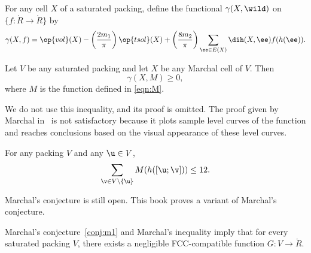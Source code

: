 \begin{definition}[$\gamma$] 
   For any cell $X$ of a saturated
  packing, define the functional $\gamma(X,\wild)$ on
  $\{f:\ring{R}\to\ring{R}\}$ by
\begin{equation}\label{eqn:gamma-def} 
\gamma(X,f) =  \op{vol}(X)
-\left(\frac{2m_1}{\pi}\right) \op{tsol}(X) + \left(\frac{8m_2}{\pi}\right)
\sum_{\ee\in E(X)} \dih(X,\ee)  f(h(\ee)).
\end{equation}
%
\end{definition}


\begin{theorem}\label{lemma:MI} 
  Let $V$ be any saturated packing and let $X$ be any Marchal cell of
  $V$.  Then
\begin{equation}\label{eqn:mfe} 
\gamma(X,M)\ge 0,
\end{equation}
where $M$ is the function defined in \eqref{eqn:M}.
\end{theorem}

\begin{remark}  %
  We do not use this inequality, and its proof is omitted.  The proof
  given by Marchal in~\cite{marchal:2009} is not satisfactory because
  it plots sample level curves of the function and reaches conclusions
  based on the visual appearance of these level curves.
\end{remark}


\begin{conjecture}[Marchal]\label{conj:m1} 
For any packing $ V$ and
any $ \u\in V$,
\[  
\sum_{\v\in V\setminus\{\u\}} M(h([\u;\v])) \le 12.
\] 
\end{conjecture}

Marchal's conjecture is still open.  This book proves a variant of
Marchal's conjecture.

\begin{theorem}\label{theorem:mk1} 
  Marchal's conjecture~\eqref{conj:m1} and Marchal's inequality imply
  that for every saturated packing $V$, there exists a negligible
  FCC-compatible function $G:V\to \ring{R}$.
\end{theorem}


